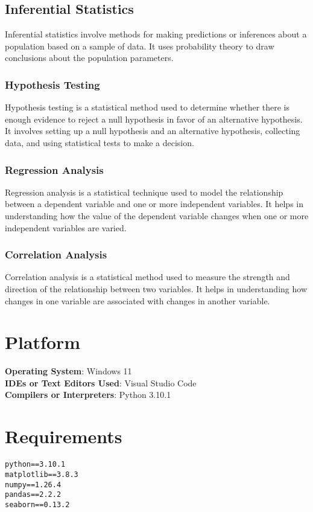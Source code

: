 \documentclass[11pt]{article}
\begin{document}
\subsection{Inferential Statistics}

Inferential statistics involve methods for making predictions or inferences about a population based on a sample of data. It uses probability theory to draw conclusions about the population parameters.

\subsubsection{Hypothesis Testing}
Hypothesis testing is a statistical method used to determine whether there is enough evidence to reject a null hypothesis in favor of an alternative hypothesis. It involves setting up a null hypothesis and an alternative hypothesis, collecting data, and using statistical tests to make a decision.

\subsubsection{Regression Analysis}

Regression analysis is a statistical technique used to model the relationship between a dependent variable and one or more independent variables. It helps in understanding how the value of the dependent variable changes when one or more independent variables are varied.

\subsubsection{Correlation Analysis}

Correlation analysis is a statistical method used to measure the strength and direction of the relationship between two variables. It helps in understanding how changes in one variable are associated with changes in another variable.

\section{Platform}
\textbf{Operating System}: Windows 11 \\
\textbf{IDEs or Text Editors Used}: Visual Studio Code\\
\textbf{Compilers or Interpreters}: Python 3.10.1\\

\section{Requirements}
\begin{lstlisting}
python==3.10.1
matplotlib==3.8.3
numpy==1.26.4
pandas==2.2.2
seaborn==0.13.2
\end{lstlisting}
\end{document}
